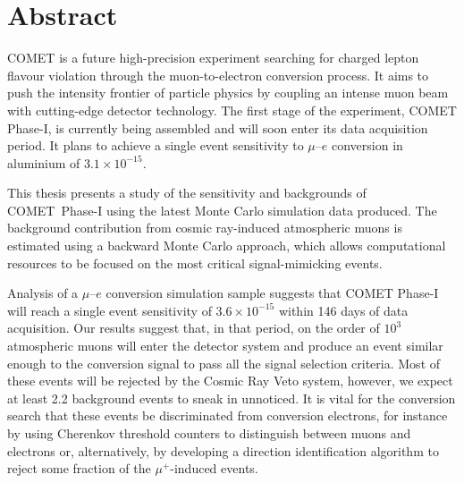 \chapter*{Abstract}


COMET is a future high-precision experiment searching for charged lepton flavour
violation through the muon-to-electron conversion process. It aims to push the
intensity frontier of particle physics by coupling an intense muon beam with
cutting-edge detector technology. The first stage of the experiment, COMET
Phase\nobreakdash-I, is currently being assembled and will soon enter its data
acquisition period. It plans to achieve a single event sensitivity to $\mu$--$e$
conversion in aluminium of $3.1 \times 10^{-15}$.

This thesis presents a study of the sensitivity and backgrounds of \mbox{COMET
Phase\nobreakdash-I} using the latest Monte Carlo simulation data produced. The
background contribution from cosmic ray-induced atmospheric muons is estimated
using a backward Monte Carlo approach, which allows computational resources to
be focused on the most critical signal-mimicking events.

Analysis of a $\mu$--$e$ conversion simulation sample suggests that COMET
Phase\nobreakdash-I will reach a single event sensitivity of $3.6 \times
10^{-15}$ within 146 days of data acquisition. Our results suggest that, in that
period, on the order of $10^3$ atmospheric muons will enter the detector system
and produce an event similar enough to the conversion signal to pass all the
signal selection criteria. Most of these events will be rejected by the Cosmic
Ray Veto system, however, we expect at least 2.2 background events to sneak in
unnoticed. It is vital for the conversion search that these events be
discriminated from conversion electrons, for instance by using
Cherenkov threshold counters to distinguish between muons and electrons or,
alternatively, by developing a direction identification algorithm to reject some
fraction of the $\mu^+$-induced events.